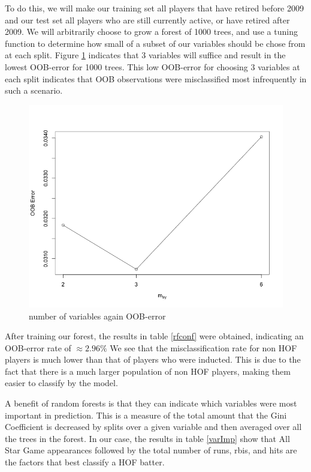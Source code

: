 \documentclass[preprint,12pt]{elsarticle}
\begin{document}
To do this, we will make our training set all players that have retired before 2009 and our test set all players who are still currently active, or have retired after 2009. We will arbitrarily choose to grow a forest of 1000 trees, and use a tuning function to determine how small of a subset of our variables should be chose from at each split. Figure \ref{mtry} indicates that 3 variables will suffice and result in the lowest OOB-error for 1000 trees. This low OOB-error for choosing 3 variables at each split indicates that OOB observations were misclassified most infrequently in such a scenario.

\begin{figure}[h]
       \centering 
       \includegraphics[width=0.85\linewidth]{mtry}
       \caption{number of variables again OOB-error}
       \label{mtry}
 \end{figure}

After training our forest, the results in table \ref{rfconf} were obtained, indicating an OOB-error rate of $\approx 2.96\%$ We see that the misclassification rate for non HOF players is much lower than that of players who were inducted. This is due to the fact that there is a much larger population of non HOF players, making them easier to classify by the model. 

A benefit of random forests is that they can indicate which variables were most important in prediction. This is a measure of the total amount that the Gini Coefficient is decreased by splits over a given variable and then averaged over all the trees in the forest. In our case, the results in table \ref{varImp} show that All Star Game appearances followed by the total number of runs, rbis, and hits are the factors that best classify a HOF batter.
\end{document}
